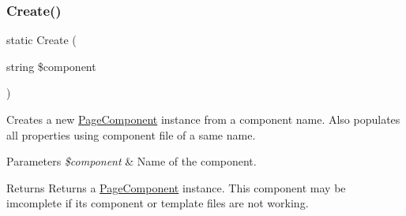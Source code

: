 \subsubsection{\texorpdfstring{Create()}{Create()}}
{\footnotesize\ttfamily static Create (\begin{DoxyParamCaption}\item[{string}]{\$component }\end{DoxyParamCaption})\hspace{0.3cm}{\ttfamily [static]}}

Creates a new \hyperlink{class_lora_1_1_page_component}{Page\+Component} instance from a component name. Also populates all properties using component file of a same name. 
\begin{DoxyParams}{Parameters}
{\em \$component} & Name of the component. \\
\hline
\end{DoxyParams}
\begin{DoxyReturn}{Returns}
Returns a \hyperlink{class_lora_1_1_page_component}{Page\+Component} instance. This component may be imcomplete if its component or template files are not working. 
\end{DoxyReturn}

